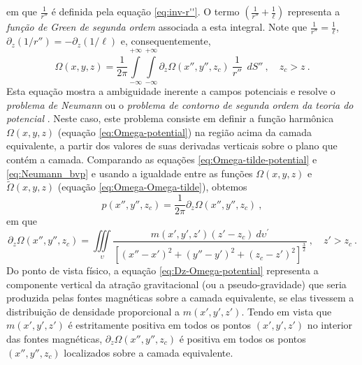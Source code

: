 em que $\frac{1}{r''}$ é definida pela equação \ref{eq:inv-r''}. O termo $\left( \frac{1}{r''} + \frac{1}{\ell} \right)$ 
representa a \textit{função de Green de segunda ordem} \citep[][ p. 246]{kellogg1967} associada a esta integral. 
Note que $\frac{1}{r''} = \frac{1}{\ell}$, $\partial_{z} (1/r'') = -\partial_{z} (1/\ell)$ e, consequentemente, 
\begin{equation}
\Omega(x, y, z) = \frac{1}{2\pi}
\int\limits_{-\infty}^{+\infty}\int\limits_{-\infty}^{+\infty}
\partial_{z} \Omega(x'', y'', z_{c}) \: \frac{1}{r''} 
\:\: dS'' \: , \quad z_{c} > z \: .
\label{eq:Neumann_bvp}
\end{equation}
Esta equação mostra a ambiguidade inerente a campos potenciais \citep{roy1962} e resolve 
o \textit{problema de Neumann} ou o \textit{problema de contorno de segunda ordem da teoria do potencial} 
\citep[][ p. 246]{kellogg1967}. Neste caso, este problema consiste em definir a função harmônica 
$\Omega(x, y, z)$ (equação \ref{eq:Omega-potential}) na região acima da camada equivalente, 
a partir dos valores de suas derivadas verticais sobre o plano que contém a camada. 
Comparando as equações \ref{eq:Omega-tilde-potential} e \ref{eq:Neumann_bvp} e usando a igualdade 
entre as funções $\Omega(x, y, z)$ e $\tilde{\Omega}(x, y, z)$ (equação \ref{eq:Omega-Omega-tilde}), 
obtemos 
\begin{equation}
p(x'', y'', z_{c}) = \frac{1}{2\pi} \partial_{z} \Omega(x'', y'', z_{c}) \: ,
\label{eq:positivity_prop}
\end{equation}
em que
\begin{equation}
\partial_{z} \Omega(x'', y'', z_{c}) = \iiint\limits_{\upsilon} 
\frac{m(x', y', z') (z' - z_{c}) \: 
d\upsilon^{\prime}}
{\left[ (x''-x')^2 + (y''-y')^2 + (z_{c}-z')^2 \right]^{\frac{3}{2}}} \: , \quad z' > z_{c} \: .
\label{eq:Dz-Omega-potential}
\end{equation}
Do ponto de vista físico, a equação \ref{eq:Dz-Omega-potential} representa a componente vertical da atração 
gravitacional (ou a pseudo-gravidade) que seria produzida pelas fontes magnéticas sobre a camada equivalente, 
se elas tivessem a distribuição de densidade proporcional a $m(x', y', z')$. Tendo em vista que 
$m(x', y', z')$ é estritamente positiva em todos os pontos $(x', y', z')$ no interior das fontes magnéticas, 
$\partial_{z} \Omega(x'', y'', z_{c})$ é positiva em todos os pontos $(x'', y'', z_{c})$ localizados sobre 
a camada equivalente.

